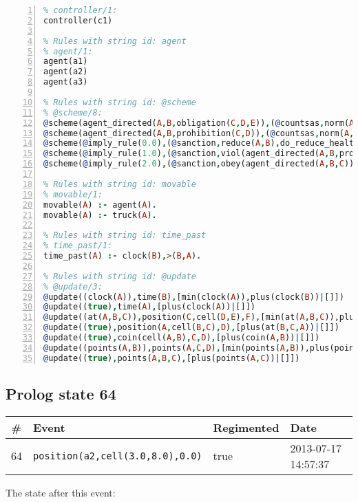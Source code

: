 \documentclass[11pt]{article}\usepackage[utf8]{inputenc}\usepackage{geometry}
\begin{document}
\begin{lstlisting}[language=Prolog, numbers=left]
% Rules with string id: controller
% controller/1:
controller(c1)

% Rules with string id: agent
% agent/1:
agent(a1)
agent(a2)
agent(a3)

% Rules with string id: @scheme
% @scheme/8:
@scheme(agent_directed(A,B,obligation(C,D,E)),(@countsas,norm(A,B,F,obligation(C,D,E)),F),false,(listTrue(C)),(time_past(D)),false,[plus(viol(agent_directed(A,B,obligation(C,D,E))))|[]],[plus(obey(agent_directed(A,B,obligation(C,D,E))))|[]])
@scheme(agent_directed(A,B,prohibition(C,D)),(@countsas,norm(A,B,E,prohibition(C,D)),E),(listTrue(C)),false,(false),false,[plus(viol(agent_directed(A,B,prohibition(C,D))))|[]],[plus(obey(agent_directed(A,B,prohibition(C,D))))|[]])
@scheme(@imply_rule(0.0),(@sanction,reduce(A,B),do_reduce_health(A,B),notifyAgent(A,changed(status))),true,false,false,false,[min(reduce(A,B))|[]],[])
@scheme(@imply_rule(1.0),(@sanction,viol(agent_directed(A,B,prohibition(C,D))),do_sanction(D)),true,false,false,false,[min(viol(agent_directed(A,B,prohibition(C,D))))|[]],[])
@scheme(@imply_rule(2.0),(@sanction,obey(agent_directed(A,B,C))),true,false,false,false,[min(obey(agent_directed(A,B,C)))|[]],[])

% Rules with string id: movable
% movable/1:
movable(A) :- agent(A).
movable(A) :- truck(A).

% Rules with string id: time_past
% time_past/1:
time_past(A) :- clock(B),>(B,A).

% Rules with string id: @update
% @update/3:
@update((clock(A)),time(B),[min(clock(A)),plus(clock(B))|[]])
@update((true),time(A),[plus(clock(A))|[]])
@update((at(A,B,C)),position(C,cell(D,E),F),[min(at(A,B,C)),plus(at(D,E,C))|[]])
@update((true),position(A,cell(B,C),D),[plus(at(B,C,A))|[]])
@update((true),coin(cell(A,B),C,D),[plus(coin(A,B))|[]])
@update((points(A,B)),points(A,C,D),[min(points(A,B)),plus(points(A,D))|[]])
@update((true),points(A,B,C),[plus(points(A,C))|[]])

\end{lstlisting}
\clearpage 
\subsection{Prolog state 64}
\begin{table}[ht]
\centering 
\begin{tabular}{l l l l} 
\textbf{\#} & \textbf{Event} & \textbf{Regimented} & \textbf{Date} \\ [0.5ex] 
\hline
64&\texttt{position(a2,cell(3.0,8.0),0.0)}&true&2013-07-17 14:57:37\\ [1ex] \hline\end{tabular}
\end{table}
The state after this event:
\end{document}
